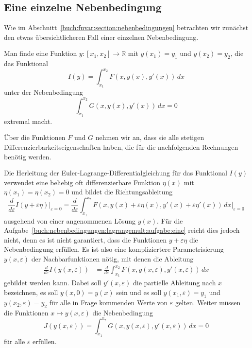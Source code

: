 %
%
\subsection{Eine einzelne Nebenbedingung
\label{buch:nebenbedingungen:lagrangemult:subsection:einzeln}}
Wie im Abschnitt~\ref{buch:fuvar:section:nebenbedingungen} betrachten
wir zunächst den etwas übersichtlicheren Fall einer einzelnen Nebenbedingung.

\begin{aufgabe}
\label{buch:nebenbedingungen:lagrangemult:aufgabe:eine}
Man finde eine Funktion $y\colon[x_1,x_2]\to\mathbb{R}$ mit $y(x_1)=y_1$
und $y(x_2)=y_2$, die das Funktional
\[
I(y)
=
\int_{x_1}^{x_2} F(x,y(x),y'(x))\,dx
\]
unter der Nebenbedingung
\[
\int_{x_1}^{x_2} G(x,y(x),y'(x))\,dx = 0
\]
extremal macht.
\end{aufgabe}

Über die Funktionen $F$ und $G$ nehmen wir an, dass sie alle stetigen
Differenzierbarkeitseigenschaften haben, die für die nachfolgenden
Rechnungen benötig werden.

Die Herleitung der Euler-Lagrange-Differentialgleichung für das
Funktional $I(y)$ verwendet eine beliebig oft differenzierbare 
Funktion $\eta(x)$ mit $\eta(x_1)=\eta(x_2)=0$ und bildet
die Richtungsableitung
\[
\frac{d}{d\varepsilon}
I(y+\varepsilon \eta)
\bigg|_{\varepsilon=0}
=
\frac{d}{d\varepsilon}
\int_{x_1}^{x_2}
F(x,y(x)+\varepsilon\eta(x),y'(x)+\varepsilon \eta'(x))\,dx
\bigg|_{\varepsilon=0}
\]
ausgehend von einer angenommenen Lösung $y(x)$.
Für die Aufgabe~\ref{buch:nebenbedingungen:lagrangemult:aufgabe:eine}
reicht dies jedoch nicht, denn es ist nicht garantiert, dass die
Funktionen $y+\varepsilon\eta$ die Nebenbedingung erfüllen.
Es ist also eine kompliziertere Parametrisierung $y(x,\varepsilon)$
der Nachbarfunktionen nötig, mit denen die Ableitung
\begin{align*}
\frac{d}{d\varepsilon}I(y(x,\varepsilon))
&=
\frac{d}{d\varepsilon}
\int_{x_1}^{x_2}
F(x,y(x,\varepsilon),y'(x,\varepsilon))\,dx
\end{align*}
gebildet werden kann.
Dabei soll $y'(x,\varepsilon)$ die partielle Ableitung nach $x$ 
bezeichnen, es soll $y(x,0)=y(x)$ sein und es soll $y(x_1,\varepsilon)=y_1$
und $y(x_2,\varepsilon)=y_2$
für alle in Frage kommenden Werte von $\varepsilon$ gelten.
Weiter müssen die Funktionen $x\mapsto y(x,\varepsilon)$ die Nebenbedingung
\[
J(y(x,\varepsilon))
=
\int_{x_1}^{x_2} G(x,y(x,\varepsilon),y'(x,\varepsilon))\,dx
=
0
\]
für alle $\varepsilon$ erfüllen.

